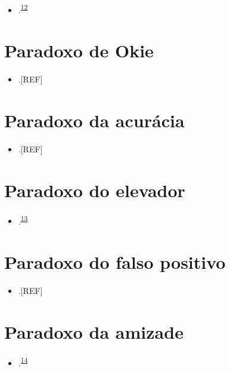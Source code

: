 \documentclass[
]{book}
\providecommand{\tightlist}{%
  \setlength{\itemsep}{0pt}\setlength{\parskip}{0pt}}
\begin{document}
\begin{itemize}
\tightlist
\item
  .\textsuperscript{\protect\hyperlink{ref-stein1956}{12}}
\end{itemize}

\hypertarget{okie}{%
\section{Paradoxo de Okie}\label{okie}}

\begin{itemize}
\tightlist
\item
  .{[}REF{]}
\end{itemize}

\hypertarget{acuracia}{%
\section{Paradoxo da acurácia}\label{acuracia}}

\begin{itemize}
\tightlist
\item
  .{[}REF{]}
\end{itemize}

\hypertarget{elevador}{%
\section{Paradoxo do elevador}\label{elevador}}

\begin{itemize}
\tightlist
\item
  .\textsuperscript{\protect\hyperlink{ref-de1996}{13}}
\end{itemize}

\hypertarget{falso-positivo}{%
\section{Paradoxo do falso positivo}\label{falso-positivo}}

\begin{itemize}
\tightlist
\item
  .{[}REF{]}
\end{itemize}

\hypertarget{amizade}{%
\section{Paradoxo da amizade}\label{amizade}}

\begin{itemize}
\tightlist
\item
  .\textsuperscript{\protect\hyperlink{ref-feld1991}{14}}
\end{itemize}
\end{document}

